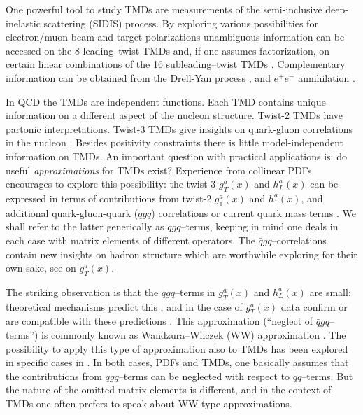 \documentclass[a4paper,11pt]{article}
\begin{document}
One powerful tool to study TMDs are measurements of the 
semi-inclusive deep-inelastic scattering (SIDIS) process.
By exploring various possibilities for electron/muon beam and target 
polarizations unambiguous information can be accessed on the 8 leading--twist 
TMDs \cite{Boer:1997nt} and, if one assumes factorization, on certain
linear combinations of the 16 subleading--twist TMDs 
\cite{Goeke:2005hb,Bacchetta:2006tn}.
Complementary information can be obtained 
from the Drell-Yan process \cite{Arnold:2008kf}, 
and $e^+e^-$ annihilation \cite{Metz:2016swz}.

In QCD the TMDs are independent functions. Each TMD contains unique
information on a different aspect of the nucleon structure. 
Twist-2 TMDs have partonic interpretations. Twist-3 TMDs 
give insights on quark-gluon correlations in the nucleon
\cite{Miller:2007ae,Burkardt:2007rv,Burkardt:2009rf}. 
Besides positivity constraints \cite{Bacchetta:1999kz} 
there is little model-independent information on TMDs. 
An important question with practical applications is:
do useful {\sl approximations} for TMDs exist? 
Experience from collinear PDFs encourages to explore this possibility: 
the twist-3 $g_T^a(x)$ and $h_L^a(x)$ can be expressed in terms of 
contributions from twist-2 $g_1^a(x)$ and $h_1^a(x)$, and additional 
quark-gluon-quark ($\bar{q}gq$) correlations or current quark mass 
terms \cite{Wandzura:1977qf,Jaffe:1991ra}. 
We shall refer to the latter generically as $\bar qgq$--terms, keeping in 
mind one deals in each case with matrix elements of different operators.
The $\bar qgq$--correlations contain new insights on hadron structure 
which are worthwhile exploring for their own sake, 
see \cite{Jaffe:1989xx} on $g_T^a(x)$.

The striking observation is that the $\bar qgq$--terms in $g_T^a(x)$ 
and $h_L^a(x)$ are small: theoretical mechanisms predict this 
\cite{Balla:1997hf,Dressler:1999hc,Gockeler:2000ja,Gockeler:2005vw}, 
and in the case of $g_T^a(x)$ data confirm or are compatible with these 
predictions \cite{Abe:1998wq,Anthony:2002hy,Airapetian:2011wu}.
This approximation (``neglect of $\bar qgq$--terms'') is commonly 
known as Wandzura--Wilczek (WW) approximation \cite{Wandzura:1977qf}.
The possibility to apply this type of approximation also to TMDs has 
been explored in specific cases in \cite{Kotzinian:1995cz,Kotzinian:1997wt,
Kotzinian:2006dw,Avakian:2007mv,Metz:2008ib,Teckentrup:2009tk,Tangerman:1994bb}.
In both cases, PDFs and TMDs, one basically assumes that the 
contributions from $\bar{q}gq$--terms can be neglected with respect to 
$\bar{q}q$--terms. But the nature of the omitted matrix elements is 
different, and in the context of TMDs one often prefers to speak 
about WW-type approximations.
\end{document}
